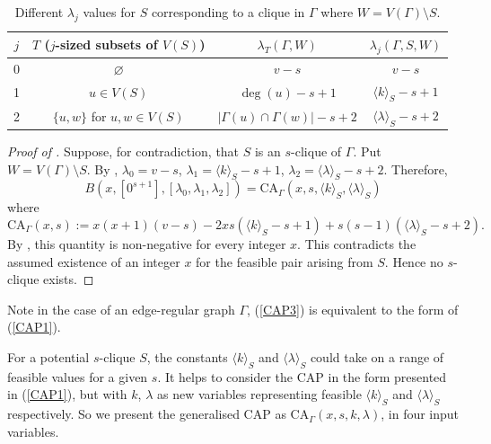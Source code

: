 \documentclass[11pt, baustms]{amsproc}
\theoremstyle{scplain}
\newcommand\CA{\mathrm{CA}}
\begin{document}
	\begin{table}[h]
		\centering
		\begin{tabular}{c c c c}
			$j$ & $T$ ($j$-sized subsets of $V(S)$) & $\lambda_T (\Gamma, W)$ & $\lambda_j (\Gamma, S, W)$ \\
			\midrule
			0 & $\varnothing $ & $v-s$ & $v-s$ \\
			1 & $u \in V(S)$ & $\deg(u)-s+1$ & $\langle k \rangle_S -s+1$ \\
			2 & $\{u,w\}$ for $u,w \in V(S)$ & $|\Gamma(u) \cap \Gamma(w)|-s+2$ & $\langle \lambda \rangle_S -s+2$ \\
			\bottomrule
		\end{tabular}
		\caption{Different $\lambda_j$ values for $S$ corresponding to a clique in $\Gamma$ where $W = V(\Gamma) \setminus S$.}
		\label{tab:gen}
	\end{table}


    
    \begin{proof}[Proof of ]
Suppose, for contradiction, that \(S\) is an \(s\)-clique of \(\Gamma\). Put \(W=V(\Gamma)\setminus S\). By ,
$\lambda_0=v-s$, $\lambda_1=\langle k\rangle_S-s+1$, $\lambda_2=\langle\lambda\rangle_S-s+2$. Therefore,
\[
B(x,[0^{s+1}],[\lambda_0,\lambda_1,\lambda_2])
=
\CA_\Gamma(x,s,\langle k\rangle_S,\langle\lambda\rangle_S)
\]
where
	\begin{equation}
		\CA_\Gamma(x,s) := x(x+1)(v-s) -2x s (\langle k \rangle_S -s+1)+s(s-1)(\langle \lambda \rangle_S -s+2). 
	\end{equation}
By , this quantity is non-negative for every integer \(x\). This contradicts the assumed existence of an integer \(x\) for the feasible pair arising from \(S\). Hence no \(s\)-clique exists.    
	\end{proof}



    
    Note in the case of an edge-regular graph $\Gamma$, (\ref{CAP3}) is equivalent to the form of (\ref{CAP1}).
	
	For a potential $s$-clique $S$, the constants $\langle k \rangle_S$ and $\langle \lambda \rangle_S$ could take on a range of feasible values for a given $s$. It helps to consider the CAP in the form presented in (\ref{CAP1}), but with $k$, $\lambda$ as new variables representing feasible $\langle k \rangle_S$ and $\langle \lambda \rangle_S$ respectively. So we present the generalised CAP as $\CA_\Gamma(x,s,k,\lambda)$, in four input variables. 
    
\end{document}
